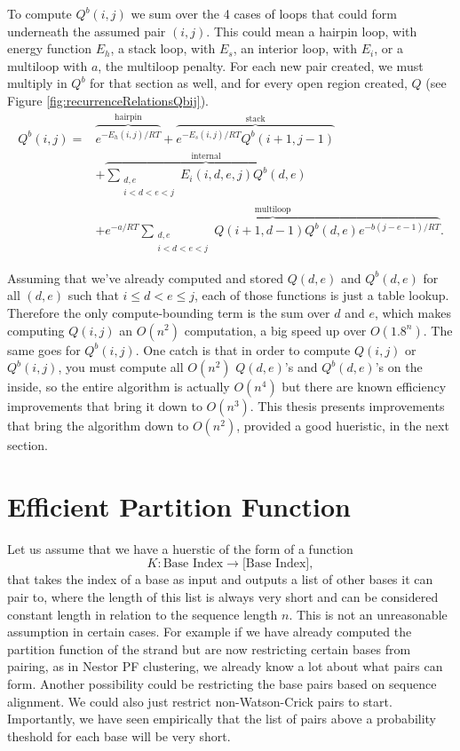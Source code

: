 To compute $Q^b(i,j)$ we sum over the 4 cases of loops that could form
underneath the assumed pair $(i,j)$. This could mean a hairpin loop,
with energy function $E_h$, a stack loop, with $E_s$, an interior
loop, with $E_i$, or a multiloop with $a$, the multiloop penalty. For
each new pair created, we must multiply in $Q^b$ for that section as
well, and for every open region created, $Q$ (see Figure
\ref{fig:recurrenceRelationsQbij}).
\begin{equation}
\begin{split}
 Q^b(i, j) =& \overbrace{e^{-E_h(i,j)/RT}}^{\text{hairpin}} +
 \overbrace{e^{-E_s(i, j)/RT} Q^b(i+1, j-1)}^{\text{stack}} \\ 
& + \overbrace{\sum_{\substack{d,e \\ i < d< e< j}} E_i(i, d, e, j)Q^b(d,e)}^{\text{internal}} \\ 
& + \overbrace{e^{-a/RT} \sum_{\substack{d,e \\ i < d< e< j}} Q(i+1, d-1) Q^b(d,e) e^{-b(j-e-1)/RT}}^{\text{multiloop}}.
\end{split}
\label{eq:Qbij}
\end{equation}

Assuming that we've already computed and stored $Q(d,e)$ and
$Q^b(d,e)$ for all $(d,e)$ such that $ i \leq d < e \leq j$, each of
those functions is just a table lookup. Therefore the only
compute-bounding term is the sum over $d$ and $e$, which makes
computing $Q(i,j)$ an $O(n^2)$ computation, a big speed up over
$O(1.8^n)$. The same goes for $Q^b(i,j)$. One catch is that in order
to compute $Q(i,j)$ or $Q^b(i,j)$, you must compute all $O(n^2)$
$Q(d,e)$'s and $Q^b(d,e)$'s on the inside, so the entire algorithm is
actually $O(n^4)$ but there are known efficiency improvements that
bring it down to $O(n^3)$. This thesis presents improvements that
bring the algorithm down to $O(n^2)$, provided a good hueristic, in
the next section.

\section{Efficient Partition Function}

Let us assume that we have a huerstic of the form of a function 
\begin{equation}
K : \text{Base Index} \to \text{[Base Index]},
\end{equation}
that takes the index of a base as input and outputs a list of other
bases it can pair to, where the length of this list is always very
short and can be considered constant length in relation to the
sequence length $n$. This is not an unreasonable assumption in certain
cases. For example if we have already computed the partition function
of the strand but are now restricting certain bases from pairing, as
in Nestor PF clustering, we already know a lot about what pairs can
form. Another possibility could be restricting the base pairs based on
sequence alignment. We could also just restrict non-Watson-Crick pairs
to start. Importantly, we have seen empirically that the list of pairs
above a probability theshold for each base will be very short.

